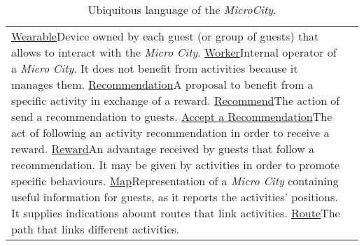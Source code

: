 \begin{table}[H]
\begin{tabular}{|l|p{}|}
        \ul{Wearable}{Device owned by each guest (or group of guests) that allows to interact with the \textit{Micro City}.}
        \ul{Worker}{Internal operator of a \textit{Micro City}. It does not benefit from activities because it manages them.}
        \ul{Recommendation}{A proposal to benefit from a specific activity in exchange of a reward.}
        \ul{Recommend}{The action of send a recommendation to guests.}
        \ul{Accept a Recommendation}{The act of following an activity recommendation in order to receive a reward.}
        \ul{Reward}{An advantage received by guests that follow a recommendation. It may be given by activities in order to promote specific behaviours.}
        \ul{Map}{Representation of a \textit{Micro City} containing useful information for guests, as it reports the activities' positions. It supplies indications abount routes that link activities.}
        \ul{Route}{The path that links different activities.}
    \end{tabular}
    \caption{Ubiquitous language of the \textit{MicroCity}.}
    \label{tab:ul}
\end{table}
